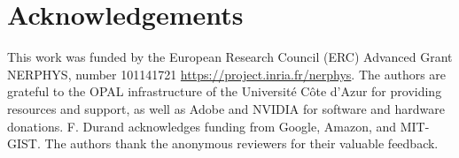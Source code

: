 \section{Acknowledgements}
This work was funded by the European Research Council (ERC) Advanced Grant NERPHYS, number 101141721 \url{https://project.inria.fr/nerphys}.
The authors are grateful to the OPAL infrastructure of the Université Côte d'Azur for providing resources and support, as well as Adobe and NVIDIA for software and hardware donations.
F. Durand acknowledges funding from Google,  Amazon, and MIT-GIST.
The authors thank the anonymous reviewers for their valuable feedback.